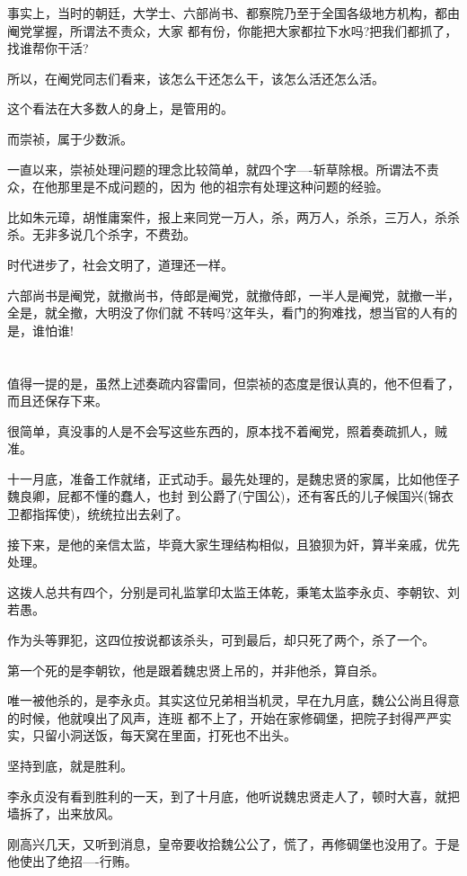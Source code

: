 \documentclass[11pt,a4paper,onecolumn]{article}
\begin{document}
事实上，当时的朝廷，大学士、六部尚书、都察院乃至于全国各级地方机构，都由阉党掌握，所谓法不责众，大家
都有份，你能把大家都拉下水吗?把我们都抓了，找谁帮你干活?

所以，在阉党同志们看来，该怎么干还怎么干，该怎么活还怎么活。

这个看法在大多数人的身上，是管用的。

而崇祯，属于少数派。

一直以来，崇祯处理问题的理念比较简单，就四个字----斩草除根。所谓法不责众，在他那里是不成问题的，因为
他的祖宗有处理这种问题的经验。

比如朱元璋，胡惟庸案件，报上来同党一万人，杀，两万人，杀杀，三万人，杀杀杀。无非多说几个杀字，不费劲。

时代进步了，社会文明了，道理还一样。

六部尚书是阉党，就撤尚书，侍郎是阉党，就撤侍郎，一半人是阉党，就撤一半，全是，就全撤，大明没了你们就
不转吗?这年头，看门的狗难找，想当官的人有的是，谁怕谁!

\section[\thesection]{}

值得一提的是，虽然上述奏疏内容雷同，但崇祯的态度是很认真的，他不但看了，而且还保存下来。

很简单，真没事的人是不会写这些东西的，原本找不着阉党，照着奏疏抓人，贼准。

十一月底，准备工作就绪，正式动手。最先处理的，是魏忠贤的家属，比如他侄子魏良卿，屁都不懂的蠢人，也封
到公爵了(宁国公)，还有客氏的儿子候国兴(锦衣卫都指挥使)，统统拉出去剁了。

接下来，是他的亲信太监，毕竟大家生理结构相似，且狼狈为奸，算半亲戚，优先处理。

这拨人总共有四个，分别是司礼监掌印太监王体乾，秉笔太监李永贞、李朝钦、刘若愚。

作为头等罪犯，这四位按说都该杀头，可到最后，却只死了两个，杀了一个。

第一个死的是李朝钦，他是跟着魏忠贤上吊的，并非他杀，算自杀。

唯一被他杀的，是李永贞。其实这位兄弟相当机灵，早在九月底，魏公公尚且得意的时候，他就嗅出了风声，连班
都不上了，开始在家修碉堡，把院子封得严严实实，只留小洞送饭，每天窝在里面，打死也不出头。

坚持到底，就是胜利。

李永贞没有看到胜利的一天，到了十月底，他听说魏忠贤走人了，顿时大喜，就把墙拆了，出来放风。

刚高兴几天，又听到消息，皇帝要收拾魏公公了，慌了，再修碉堡也没用了。于是他使出了绝招----行贿。
\end{document}
